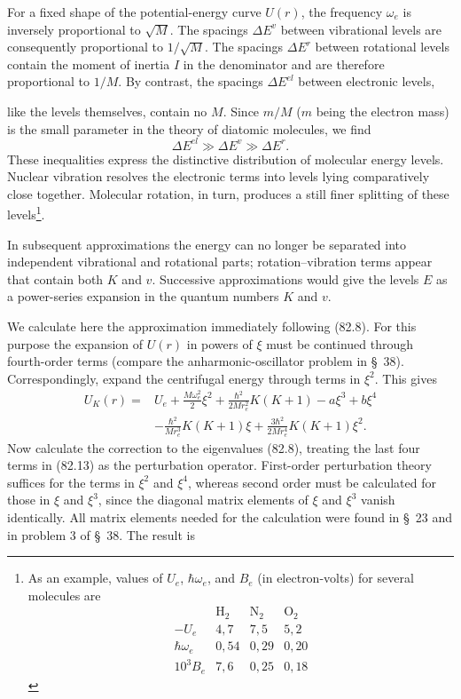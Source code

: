 For a fixed shape of the potential-energy curve $U(r)$, the frequency $\omega_e$ is inversely proportional to $\sqrt M$. The spacings $\Delta E^v$ between vibrational levels are consequently proportional to $1/\sqrt M$. The spacings $\Delta E^r$ between rotational levels contain the moment of inertia $I$ in the denominator and are therefore proportional to $1/M$. By contrast, the spacings $\Delta E^{el}$ between electronic levels,

like the levels themselves, contain no $M$. Since $m/M$ ($m$ being the electron mass) is the small parameter in the theory of diatomic molecules, we find
\begin{equation}\Delta E^{el}\gg\Delta E^v\gg\Delta E^r.\tag{82.12}\end{equation}
These inequalities express the distinctive distribution of molecular energy levels. Nuclear vibration resolves the electronic terms into levels lying comparatively close together. Molecular rotation, in turn, produces a still finer splitting of these levels\footnote{As an example, values of $U_e$, $\hbar\omega_e$, and $B_e$ (in electron-volts) for several molecules are
\[\begin{array}{c|ccc}&\mathrm H_2&\mathrm N_2&\mathrm O_2\\\hline-U_e&4{,}7&7{,}5&5{,}2\\\hbar\omega_e&0{,}54&0{,}29&0{,}20\\10^3B_e&7{,}6&0{,}25&0{,}18\end{array}\] }.

In subsequent approximations the energy can no longer be separated into independent vibrational and rotational parts; rotation--vibration terms appear that contain both $K$ and $v$. Successive approximations would give the levels $E$ as a power-series expansion in the quantum numbers $K$ and $v$.

We calculate here the approximation immediately following (82.8). For this purpose the expansion of $U(r)$ in powers of $\xi$ must be continued through fourth-order terms (compare the anharmonic-oscillator problem in \S~38). Correspondingly, expand the centrifugal energy through terms in $\xi^2$. This gives
\begin{equation}\begin{split}U_K(r)={}&U_e+\frac{M\omega_e^2}{2}\xi^2+\frac{\hbar^2}{2Mr_e^2}K(K+1)-a\xi^3+b\xi^4\\&-\frac{\hbar^2}{Mr_e^3}K(K+1)\xi+\frac{3\hbar^2}{2Mr_e^4}K(K+1)\xi^2.\end{split}\tag{82.13}\end{equation}
Now calculate the correction to the eigenvalues (82.8), treating the last four terms in (82.13) as the perturbation operator. First-order perturbation theory suffices for the terms in $\xi^2$ and $\xi^4$, whereas second order must be calculated for those in $\xi$ and $\xi^3$, since the diagonal matrix elements of $\xi$ and $\xi^3$ vanish identically. All matrix elements needed for the calculation were found in \S~23 and in problem 3 of \S~38. The result is

